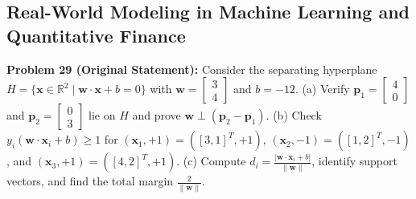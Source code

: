 \documentclass[11pt, letterpaper]{article}
\theoremstyle{definition}
\theoremstyle{remark}
\begin{document}
\subsection{Real-World Modeling in Machine Learning and Quantitative Finance}

\textbf{Problem 29 (Original Statement):} Consider the separating hyperplane $H = \{\mathbf{x} \in \mathbb{R}^2 \mid \mathbf{w} \cdot \mathbf{x} + b = 0\}$ with $\mathbf{w} = \begin{bmatrix} 3 \\ 4 \end{bmatrix}$ and $b = -12$. (a) Verify $\mathbf{p}_1 = \begin{bmatrix} 4 \\ 0 \end{bmatrix}$ and $\mathbf{p}_2 = \begin{bmatrix} 0 \\ 3 \end{bmatrix}$ lie on $H$ and prove $\mathbf{w} \perp (\mathbf{p}_2 - \mathbf{p}_1)$. (b) Check $y_i(\mathbf{w} \cdot \mathbf{x}_i + b) \ge 1$ for $(\mathbf{x}_1, +1) = ([3,1]^T, +1)$, $(\mathbf{x}_2, -1) = ([1,2]^T, -1)$, and $(\mathbf{x}_3, +1) = ([4,2]^T, +1)$. (c) Compute $d_i = \frac{|\mathbf{w}\cdot\mathbf{x}_i + b|}{\|\mathbf{w}\|}$, identify support vectors, and find the total margin $\frac{2}{\|\mathbf{w}\|}$.
\end{document}
